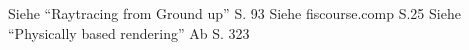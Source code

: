 Siehe "`Raytracing from Ground up"' S. 93
Siehe fiscourse.comp S.25
Siehe "`Physically based rendering"' Ab S. 323